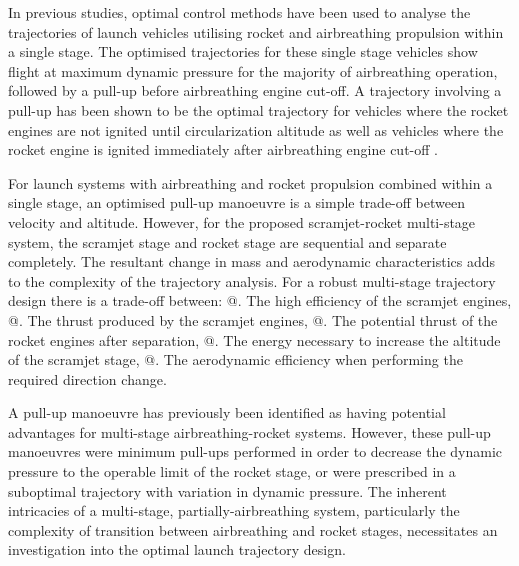 \documentclass[journal]{new-aiaa}
\makeatletter
\newcommand*{\rom}[1]{\expandafter\@slowromancap\romannumeral #1@}
\makeatother
\begin{document}
 In previous studies, optimal control methods have been used to analyse the trajectories of launch vehicles utilising rocket and airbreathing propulsion within a single stage\cite{Powell1991,Lu1993,Trefny1999}. The optimised trajectories for these single stage vehicles show flight at maximum dynamic pressure for the majority of airbreathing operation, followed by a pull-up before airbreathing engine cut-off\cite{Powell1991,Lu1993,Trefny1999}. 
 A trajectory involving a pull-up has been shown to be the optimal trajectory for vehicles where the rocket engines are not ignited until circularization altitude \cite{Powell1991,Lu1993} as well as vehicles where the rocket engine is ignited immediately after airbreathing engine cut-off \cite{Trefny1999}.


 For launch systems with airbreathing and rocket propulsion combined within a single stage, an optimised pull-up manoeuvre is a simple trade-off between velocity and altitude. However, for the proposed scramjet-rocket multi-stage system, the scramjet stage and rocket stage are sequential and separate completely.
 The resultant change in mass and aerodynamic characteristics adds to the complexity of the trajectory analysis.
 For a robust multi-stage trajectory design there is a trade-off between: 
 \rom{1}. The high efficiency of the scramjet engines,
\rom{2}. The thrust produced by the scramjet engines, 
\rom{3}. The potential thrust of the rocket engines after separation,
\rom{4}. The energy necessary to increase the altitude of the scramjet stage,
\rom{5}. The aerodynamic efficiency when performing the required direction change.


  A pull-up manoeuvre has previously been identified as having potential advantages for multi-stage airbreathing-rocket systems\cite{Tsuchiya2005,Wilhite1991,Mehta2001}. 
  However, these pull-up manoeuvres were minimum pull-ups performed in order to decrease the dynamic pressure to the operable limit of the rocket stage\cite{Tsuchiya2005,Wilhite1991}, or were prescribed in a suboptimal trajectory with variation in dynamic pressure\cite{Mehta2001}. 
   The inherent intricacies of a multi-stage, partially-airbreathing system, particularly the complexity of transition between airbreathing and rocket stages, necessitates an investigation into the optimal launch trajectory design. 
  

   
   
\end{document}
